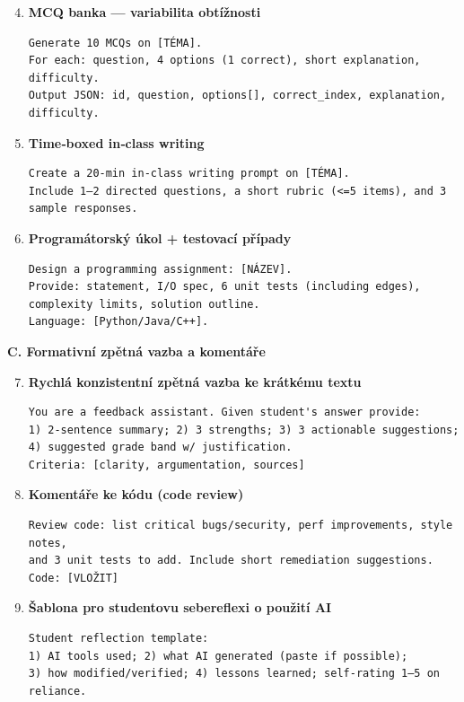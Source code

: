 \begin{enumerate}
  \setcounter{enumi}{3}
  \item \textbf{MCQ banka — variabilita obtížnosti}
  \begin{verbatim}
Generate 10 MCQs on [TÉMA].
For each: question, 4 options (1 correct), short explanation, difficulty.
Output JSON: id, question, options[], correct_index, explanation, difficulty.
  \end{verbatim}
  \item \textbf{Time‑boxed in‑class writing}
  \begin{verbatim}
Create a 20-min in-class writing prompt on [TÉMA].
Include 1–2 directed questions, a short rubric (<=5 items), and 3 sample responses.
  \end{verbatim}
  \item \textbf{Programátorský úkol + testovací případy}
  \begin{verbatim}
Design a programming assignment: [NÁZEV].
Provide: statement, I/O spec, 6 unit tests (including edges), complexity limits, solution outline.
Language: [Python/Java/C++].
  \end{verbatim}
\end{enumerate}

\medskip

\textbf{C. Formativní zpětná vazba a komentáře}

\begin{enumerate}
  \setcounter{enumi}{6}
  \item \textbf{Rychlá konzistentní zpětná vazba ke krátkému textu}
  \begin{verbatim}
You are a feedback assistant. Given student's answer provide:
1) 2-sentence summary; 2) 3 strengths; 3) 3 actionable suggestions;
4) suggested grade band w/ justification.
Criteria: [clarity, argumentation, sources]
  \end{verbatim}
  \item \textbf{Komentáře ke kódu (code review)}
  \begin{verbatim}
Review code: list critical bugs/security, perf improvements, style notes,
and 3 unit tests to add. Include short remediation suggestions.
Code: [VLOŽIT]
  \end{verbatim}
  \item \textbf{Šablona pro studentovu sebereflexi o použití AI}
  \begin{verbatim}
Student reflection template:
1) AI tools used; 2) what AI generated (paste if possible);
3) how modified/verified; 4) lessons learned; self-rating 1–5 on reliance.
  \end{verbatim}
\end{enumerate}

